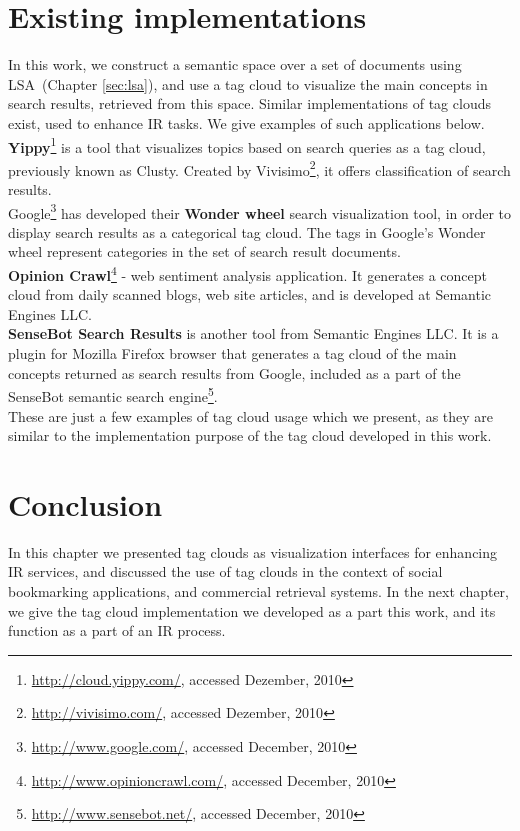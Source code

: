 \section{Existing implementations}
In this work, we construct a semantic space over a set of documents using \gls{LSA}~(Chapter \ref{sec:lsa}), and use a tag cloud to visualize the main concepts in search results, retrieved from this space. Similar implementations of tag clouds exist, used to enhance \gls{IR} tasks. We give  examples of such applications below. \\

\textbf{Yippy}\footnote{\url{http://cloud.yippy.com/}, accessed Dezember, 2010} is a tool that visualizes topics based on search queries as a tag cloud, previously known as Clusty. Created by Vivisimo\footnote{\url{http://vivisimo.com/}, accessed Dezember, 2010}, it offers classification of search results. \\

Google\footnote{\url{http://www.google.com/}, accessed December, 2010} has developed their \textbf{Wonder wheel} search visualization tool, in order to display search results as a categorical tag cloud. The tags in Google's Wonder wheel represent categories in the set of search result documents. \\ 

\textbf{Opinion Crawl}\footnote{\url{http://www.opinioncrawl.com/}, accessed December, 2010} - web sentiment analysis application. It generates a concept cloud from daily scanned blogs, web site articles, and is developed at Semantic Engines LLC.\\

\textbf{SenseBot Search Results} is another tool from Semantic Engines LLC. It is a plugin for Mozilla Firefox browser that generates a tag cloud of the main concepts returned as search results from Google, included as a part of the SenseBot semantic search engine\footnote{\url{http://www.sensebot.net/}, accessed December, 2010}.\\

These are just a few examples of tag cloud usage which we present, as they are similar to the implementation purpose of the tag cloud developed in this work.  \\

\section{Conclusion}
In this chapter we presented tag clouds as visualization interfaces for enhancing \gls{IR} services, and discussed the use of tag clouds in the context of social bookmarking applications, and commercial retrieval systems. In the next chapter, we give the tag cloud implementation we developed as a part this work, and its function as a part of an \gls{IR} process. \\

